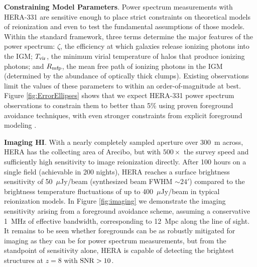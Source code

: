 \documentclass[preprint]{aastex}
\newcommand{\Mycitep}[1]{{\bf \citep{#1}}}
\newcommand{\compress}{\vspace{-0.25in}}
\begin{document}

{\bf Constraining Model Parameters}. Power spectrum measurements with HERA-331 are sensitive enough to place strict constraints on theoretical models of
reionization and even to test the fundamental assumptions of those models.  Within the standard framework,
three terms determine the major features of the power spectrum: $\zeta$, the efficiency at which galaxies
release ionizing photons  into the IGM; $T_{\rm vir}$, the minimum virial temperature of halos that produce
ionizing photons; and $R_{\rm mfp}$, the mean free path of ionizing
photons in the IGM (determined by the abundance of optically thick clumps).  Existing
observations limit the values of these parameters to within an order-of-magnitude at best.
Figure \ref{fig:ErrorEllipses} shows that we expect
HERA-331 power spectrum observations to constrain them to better
than 5\% using proven foreground avoidance techniques, with even stronger constraints from
explicit foreground modeling \Mycitep{pober_et_al2014}.


{\bf Imaging HI}. With a nearly completely sampled aperture over 300~m across, HERA has the collecting area of Arecibo, but
with $500\times$ the survey speed and sufficiently high sensitivity to image reionization directly.  After 100 hours on a
single field (achievable in 200 nights), HERA reaches a surface brightness sensitivity
of 50~$\mu$Jy/beam (synthesized beam FWHM $\sim 24'$) compared to the brightness temperature fluctuations of up to 400~$\mu$Jy/beam in typical reionization models.
In Figure \ref{fig:imaging} we demonstrate the
imaging sensitivity arising from a foreground avoidance scheme, assuming a conservative 1~MHz of effective bandwidth, corresponding to 12~Mpc along the line of
sight.  It remains to be seen whether foregrounds can be as robustly mitigated for imaging as they can be for power spectrum measurements, but from the standpoint of sensitivity alone, HERA is capable of detecting the brightest structures at $z=8$ with ${\rm SNR}>10$.
\end{document}
